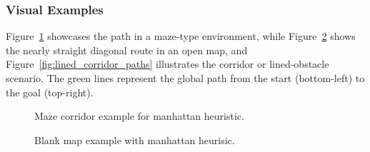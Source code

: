 \documentclass[letterpaper, 10 pt, conference]{ieeeconf}
\begin{document}
\subsubsection{Visual Examples}
Figure~\ref{fig:maze_paths} showcases the path in a maze‐type environment, while Figure~\ref{fig:blank_paths} shows the nearly straight diagonal 
route in an open map, and Figure~\ref{fig:lined_corridor_paths} illustrates the corridor or lined‐obstacle scenario.
 The green lines represent the global path from the start (bottom-left) to the goal (top-right).

\begin{figure}[!ht]
    \centering
    \caption{Maze corridor example for manhattan heuristic.}
    \label{fig:maze_paths}
\end{figure}

\begin{figure}[!ht]
    \centering
    \caption{Blank map example with manhattan heurisic.}
    \label{fig:blank_paths}
\end{figure}
\end{document}
